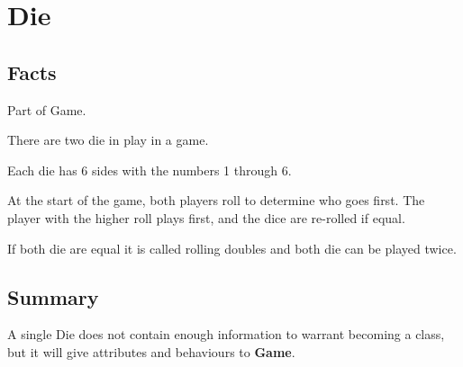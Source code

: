 \section{Die}

\subsection{Facts}

\begin{dashed}
    \item Part of Game.
    \item There are two die in play in a game.
    \item Each die has 6 sides with the numbers 1 through 6.
    \item At the start of the game, both players roll to determine who goes first.
    The player with the higher roll plays first, and the dice are re-rolled if equal.
    \item If both die are equal it is called rolling doubles and both die can be played twice.
\end{dashed}


\subsection{Summary}
A single Die does not contain enough information to warrant becoming a class, but it will give attributes and behaviours to \textbf{Game}.

